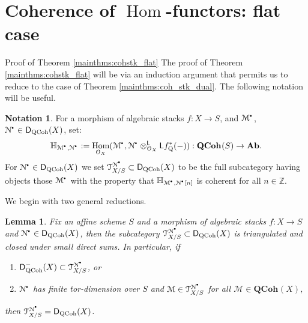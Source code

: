 \documentclass{amsart}
\theoremstyle{plain}
\newtheorem{lem}[thm]{Lemma}
\theoremstyle{definition}
\newtheorem{notn}[thm]{Notation}
\theoremstyle{remark}
\numberwithin{equation}{section}
\newcommand{\Z}{\mathbb{Z}}
\newcommand{\Orb}{\mathcal{O}}
\newcommand{\QCOHB}{\mathbf{QCoh}}
\newcommand{\QCOH}[2][]{\QCOHB^{#1}({#2})}
\DeclareMathOperator{\Hom}{Hom}
\newcommand{\LDERF}{\mathsf{L}}
\newcommand{\DCAT}{\mathsf{D}}
\newcommand{\tensor}{\otimes}
\newcommand{\AB}{\mathbf{Ab}}
\newcommand{\shv}[1]{\mathcal{{#1}}}
\newcommand{\E}[2]{\mathbb{H}_{{#1},{#2}}}
\newcommand{\QCPBK}[1]{{#1}_{\mathrm{Q}}^*}
\newcommand{\DQCOH}{\DCAT_{\mathrm{QCoh}}}
\newcommand{\TSUB}[2]{\mathcal{T}_{{#1}}^{{#2}}}
\newcommand{\sbt}{\,\begin{picture}(-1,-1)(0,-2)\circle*{1.5}\end{picture}\ }
\newcommand{\cplx}[1]{\shv{{#1}}^{\sbt}}
\begin{document}
\section{Coherence of $\Hom$-functors: flat case}\label{sec:pf_cohstk_flat}
Proof of Theorem
  \ref{mainthms:cohstk_flat} The proof of Theorem \ref{mainthms:cohstk_flat} will be via an
induction argument that permits us to reduce to the case of Theorem
\ref{mainthms:coh_stk_dual}. The following notation will be
useful. 
\begin{notn}
  For a morphism of algebraic stacks $f : X \to S$, and $\cplx{M}$,
  $\cplx{N} \in \DQCOH(X)$, set:
  \[
  \E{\cplx{M}}{\cplx{N}} :=
  \Hom_{\Orb_X}(\cplx{M},\cplx{N}\tensor_{\Orb_X}^\LDERF
  \LDERF \QCPBK{f}(-)) : \QCOH{S} \to \AB.
  \]
  For $\cplx{N} \in \DQCOH(X)$ we set
  $\TSUB{X/S}{\cplx{N}} \subset \DQCOH(X)$ to 
  be the full subcategory having objects those $\cplx{M}$ with
  the property that $\E{\cplx{M}}{\cplx{N}[n]}$ is coherent
  for all $n\in \Z$.
\end{notn}
We begin with two general reductions. 
\begin{lem}\label{lem:cohstk_bdd_red}
  Fix an affine scheme $S$ and a morphism of algebraic stacks $f : X
  \to S$ and $\cplx{N} \in \DQCOH(X)$, then the subcategory
  $\TSUB{X/S}{\cplx{N}}\subset \DQCOH(X)$ is triangulated and closed
  under small direct sums. In particular, if
  \begin{enumerate}
  \item \label{lem:cohstk_bdd_red:item:above}
    $\DCAT^-_{\mathrm{QCoh}}(X) \subset \TSUB{X/S}{\cplx{N}}$, or
  \item \label{lem:cohstk_bdd_red:item:shv} $\cplx{N}$ has finite tor-dimension over $S$ and $\shv{M} \in \TSUB{X/S}{\cplx{N}}$ for
    all $\shv{M} \in \QCOH{X}$,
  \end{enumerate}
  then $\TSUB{X/S}{\cplx{N}} = \DQCOH(X)$.
\end{lem}
\end{document}

